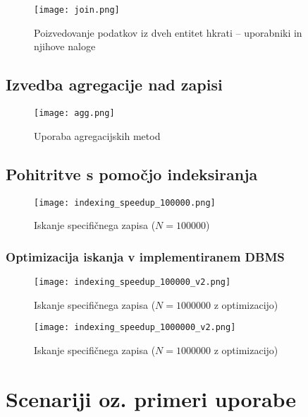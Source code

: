 \documentclass[a4paper,12pt,openright]{book}
\begin{document}
    \begin{figure}[H]
        \centerline{\texttt{[image: join.png]}}
        \caption{Poizvedovanje podatkov iz dveh entitet hkrati – uporabniki in njihove naloge}
        \label{join}
    \end{figure}
    
    \newpage
    \section{Izvedba agregacije nad zapisi}

    \begin{figure}[H]
        \centerline{\texttt{[image: agg.png]}}
        \caption{Uporaba agregacijskih metod}
        \label{join}
    \end{figure}

    \newpage
    \section{Pohitritve s pomočjo indeksiranja}

    \begin{figure}[H]
        \centerline{\texttt{[image: indexing\_speedup\_100000.png]}}
        \caption{Iskanje specifičnega zapisa ($N = \num{100000}$)}
        \label{join}
    \end{figure}


    \subsection{Optimizacija iskanja v implementiranem DBMS}
    \begin{figure}[H]
        \centerline{\texttt{[image: indexing\_speedup\_100000\_v2.png]}}
        \caption{Iskanje specifičnega zapisa ($N = \num{1000000}$ z optimizacijo)}
        \label{join}
    \end{figure}

    \begin{figure}[H]
        \centerline{\texttt{[image: indexing\_speedup\_1000000\_v2.png]}}
        \caption{Iskanje specifičnega zapisa ($N = \num{1000000}$ z optimizacijo)}
        \label{join}
    \end{figure}


    
\chapter{Scenariji oz. primeri uporabe}
\label{ch3}
\end{document}
